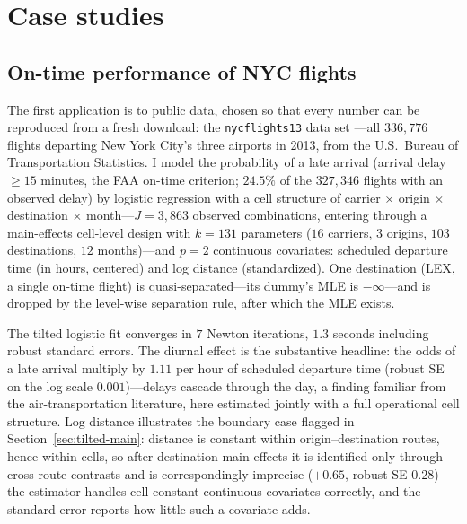 \documentclass[11pt]{article}
\begin{document}
\section{Case studies}\label{sec:applications}

\subsection{On-time performance of NYC flights}\label{sec:app-flights}

The first application is to public data, chosen so that every number can
be reproduced from a fresh download: the \texttt{nycflights13} data set
\citep{wickham2018}---all $336{,}776$ flights departing New York City's
three airports in 2013, from the U.S.\ Bureau of Transportation
Statistics.  I model the probability of a late arrival (arrival delay
$\ge 15$ minutes, the FAA on-time criterion; $24.5\%$ of the $327{,}346$
flights with an observed delay) by logistic regression with a cell
structure of carrier $\times$ origin $\times$ destination $\times$
month---$J = 3{,}863$ observed combinations, entering through a
main-effects cell-level design with $k = 131$ parameters ($16$ carriers,
$3$ origins, $103$ destinations, $12$ months)---and $p = 2$ continuous
covariates: scheduled departure time (in hours, centered) and log
distance (standardized).  One destination (LEX, a single on-time
flight) is quasi-separated---its dummy's MLE is $-\infty$---and is
dropped by the level-wise separation rule, after which the MLE exists.

The tilted logistic fit converges in $7$ Newton iterations,
$1.3$ seconds including robust standard errors.  The diurnal effect is
the substantive headline: the odds of a late arrival multiply by
$1.11$ per hour of scheduled departure time (robust SE on the log scale
$0.001$)---delays cascade through the day, a finding familiar from the
air-transportation literature, here estimated jointly with a full
operational cell structure.  Log distance illustrates the boundary case
flagged in Section~\ref{sec:tilted-main}: distance is constant within
origin--destination routes, hence within cells, so after destination
main effects it is identified only through cross-route contrasts and is
correspondingly imprecise ($+0.65$, robust SE $0.28$)---the estimator
handles cell-constant continuous covariates correctly, and the standard
error reports how little such a covariate adds.
\end{document}
